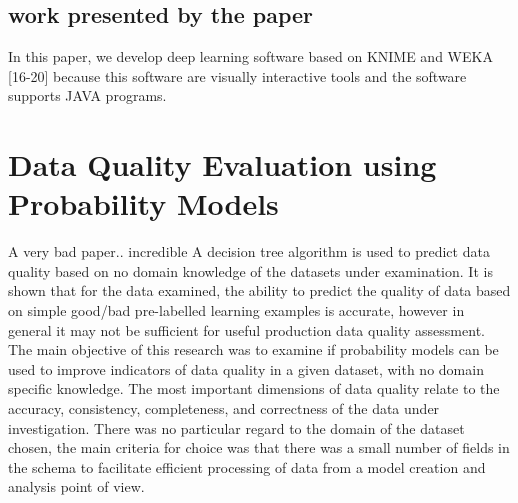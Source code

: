 \documentclass{article}
\begin{document}
\subsection{work presented by the paper}
In this paper, we develop deep learning
software based on KNIME and WEKA [16-20]
because this software are visually interactive
tools and the software supports JAVA programs.
\section{Data Quality Evaluation using Probability Models}
A very bad paper.. incredible
A decision tree algorithm is used to predict data quality based
on no domain knowledge of the datasets under examination. It is shown that for the data examined, the ability
to predict the quality of data based on simple good/bad pre-labelled learning examples is accurate, however
in general it may not be sufficient for useful production data quality assessment.
The main objective of this research was to examine if
probability models can be used to improve indicators
of data quality in a given dataset, with no domain
specific knowledge.
The most important dimensions of data
quality relate to the accuracy, consistency, completeness, and correctness of the data under investigation.
There was no particular regard to the
domain of the dataset chosen, the main criteria for
choice was that there was a small number of fields in
the schema to facilitate efficient processing of data
from a model creation and analysis point of view.
\end{document}
